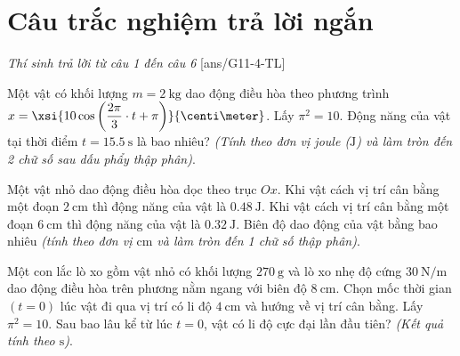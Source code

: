 \section{Câu trắc nghiệm trả lời ngắn} \textit{Thí sinh trả lời từ câu 1 đến câu 6}
\setcounter{ex}{0}
[ans/G11-4-TL]
\begin{ex}
	Một vật có khối lượng $m =\SI{2}{\kilogram}$ dao động điều hòa theo phương trình $x=\xsi{10\cos\left(\dfrac{2\pi}{3}\cdot t+\pi\right)}{\centi\meter}$. Lấy $\pi^2=10$. Động năng của vật tại thời điểm $t=\SI{15.5}{\second}$ là bao nhiêu? \textit{(Tính theo đơn vị joule ($\si{\joule}$) và làm tròn đến 2 chữ số sau dấu phẩy thập phân)}. 
\end{ex}
\begin{ex}
	Một vật nhỏ dao động điều hòa dọc theo trục $Ox$. Khi vật cách vị trí cân bằng một đoạn $\SI{2}{\centi\meter}$ thì động năng của vật là $\SI{0.48}{\joule}$. Khi vật cách vị trí cân bằng một đoạn $\SI{6}{\centi\meter}$ thì động năng của vật là $\SI{0.32}{\joule}$. Biên độ dao động của vật bằng bao nhiêu \textit{(tính theo đơn vị $\si{\centi\meter}$ và làm tròn đến 1 chữ số thập phân)}. 
\end{ex}
\begin{ex}
	Một con lắc lò xo gồm vật nhỏ có khối lượng $\SI{270}{\gram}$ và lò xo nhẹ độ cứng $\SI{30}{\newton/\meter}$ dao động điều hòa trên phương nằm ngang với biên độ $\SI{8}{\centi\meter}$. Chọn mốc thời gian $(t = 0)$ lúc vật đi qua vị trí có li độ $\SI{4}{\centi\meter}$ và hướng về vị trí cân bằng. Lấy $\pi^2=10$. Sau bao lâu kể từ lúc $t = 0$, vật có li độ cực đại lần đầu tiên? \textit{(Kết quả tính theo $\si{\second}$)}.
\end{ex}

